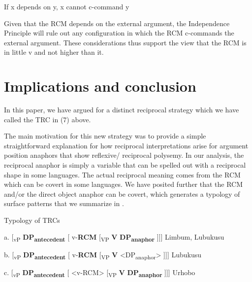 \documentclass[output=paper]{langsci/langscibook}
\begin{document}
  If x depends on y, x cannot c-command y

Given that the RCM depends on the external argument, the Independence Principle will rule out any configuration in which the RCM c-commands the external argument. These considerations thus support the view that the RCM is in little v and not higher than it. 

\chapter{Implications and conclusion}

  In this paper, we have argued for a distinct reciprocal strategy which we have called the TRC in (7) above. 

The main motivation for this new strategy was to provide a simple straightforward explanation for how reciprocal interpretations arise for argument position anaphors that show reflexive/ reciprocal polysemy. In our analysis, the reciprocal anaphor is simply a variable that can be spelled out with a reciprocal shape in some languages. The actual reciprocal meaning comes from the RCM which can be covert in some languages. We have posited further that the RCM and/or the direct object anaphor can be covert, which generates a typology of surface patterns that we summarize in .

\begin{stylelsTableHeading}%
\begin{table}
\caption{Typology of TRCs}
\label{tab:1}
\end{table}\end{stylelsTableHeading}

\begin{stylelsTable}
  a.  [\textsubscript{vP }\textbf{DP}\textbf{\textsubscript{antecedent}} [ v-\textbf{RCM}   [\textsubscript{VP} \textbf{V}  \textbf{DP}\textbf{\textsubscript{anaphor}} ]]]     Limbum, Lubukusu
\end{stylelsTable}

\begin{stylelsTable}
  b.  [\textsubscript{vP }\textbf{DP}\textbf{\textsubscript{antecedent}} [ v-\textbf{RCM}   [\textsubscript{VP} \textbf{V}  {\textless}DP\textsubscript{anaphor}{\textgreater} ]]]    Lubukusu  
\end{stylelsTable}

\begin{stylelsTable}
  c.  [\textsubscript{vP }\textbf{DP}\textbf{\textsubscript{antecedent}} [ {\textless}v-RCM{\textgreater}   [\textsubscript{VP} \textbf{V}  \textbf{DP}\textbf{\textsubscript{anaphor}} ]]]    Urhobo
\end{stylelsTable}
\end{document}
